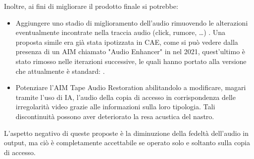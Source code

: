 Inoltre, ai fini di migliorare il prodotto finale si potrebbe:
\begin{itemize}
    \item \begin{onehalfspace}
        Aggiungere uno stadio di miglioramento dell'audio rimuovendo le alterazioni eventualmente incontrate nella traccia audio (click, rumore, \dots) \cite{godsillDigitalAudioRestoration1998}.
        Una proposta simile era già stata ipotizzata in \ac{CAE}, come si può vedere dalla presenza di un \ac{AIM} chiamato "Audio Enhancer" in \cite{mpaiMPAICAEUseCases2021} nel 2021, quest'ultimo è stato rimosso nelle iterazioni successive, le quali hanno portato alla versione che attualmente è standard: .
    \end{onehalfspace}
    \item \begin{onehalfspace}
        Potenziare l'\ac{AIM} Tape Audio Restoration abilitandolo a modificare, magari tramite l'uso di \acl{IA}, l'audio della copia di accesso in corrispondenza delle irregolarità video grazie alle informazioni sulla loro tipologia. Tali discontinuità possono aver deteriorato la resa acustica del nastro.
    \end{onehalfspace}
\end{itemize}

L'aspetto negativo di queste proposte è la diminuzione della fedeltà dell'audio in output, ma ciò è completamente accettabile se operato solo e soltanto sulla copia di accesso.
